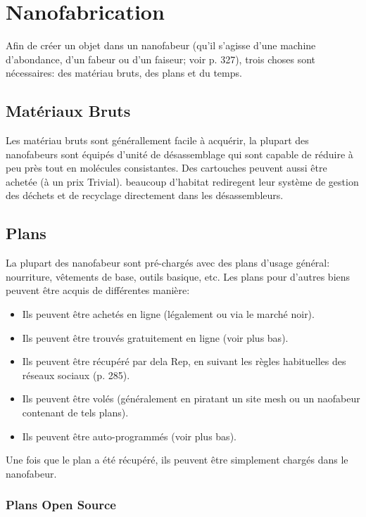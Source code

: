 \section{Nanofabrication} 

Afin de créer un objet dans un nanofabeur (qu'il s'agisse d'une machine d'abondance, d'un fabeur ou d'un faiseur; voir p. 327), trois choses sont nécessaires: des matériau bruts, des plans et du temps. 

\subsection{Matériaux Bruts} 

Les matériau bruts sont générallement facile à acquérir, la plupart des nanofabeurs sont équipés d'unité de désassemblage qui sont capable de réduire à peu près tout en molécules consistantes. Des cartouches peuvent aussi être achetée (à un prix Trivial). beaucoup d'habitat rediregent leur système de gestion des déchets et de recyclage directement dans les désassembleurs. 

\subsection{Plans} 

La plupart des nanofabeur sont pré-chargés avec des plans d'usage général: nourriture, vêtements de base, outils basique, etc. Les plans pour d'autres biens peuvent  être acquis de différentes manière: 

\begin{itemize} \item Ils peuvent être achetés en ligne (légalement ou via le marché noir). \item Ils peuvent être trouvés gratuitement en ligne (voir plus bas). \item Ils peuvent être récupéré par dela Rep, en suivant les règles habituelles des réseaux sociaux (p. 285). \item Ils peuvent être volés (généralement en piratant un site mesh ou un naofabeur contenant de tels plans). \item Ils peuvent être auto-programmés (voir plus bas). \end{itemize} 

\noindent Une fois que le plan a été récupéré, ils peuvent être simplement chargés dans le nanofabeur. 

\subsubsection{Plans Open Source} 


